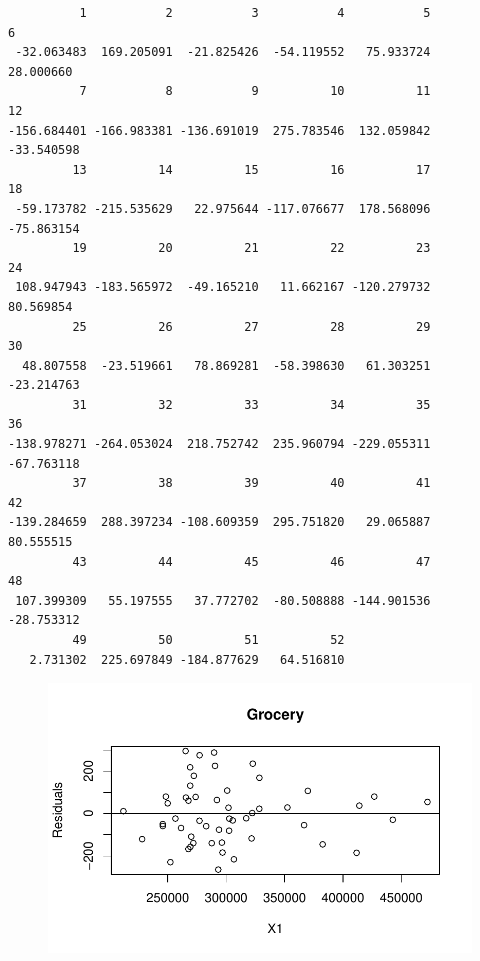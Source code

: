 \documentclass[
  letterpaper,
  DIV=11,
  numbers=noendperiod]{scrartcl}
\newenvironment{Shaded}{\begin{snugshade}}{\end{snugshade}}
\newcommand{\AttributeTok}[1]{\textcolor[rgb]{0.40,0.45,0.13}{#1}}
\newcommand{\CommentTok}[1]{\textcolor[rgb]{0.37,0.37,0.37}{#1}}
\newcommand{\DecValTok}[1]{\textcolor[rgb]{0.68,0.00,0.00}{#1}}
\newcommand{\FunctionTok}[1]{\textcolor[rgb]{0.28,0.35,0.67}{#1}}
\newcommand{\NormalTok}[1]{\textcolor[rgb]{0.00,0.23,0.31}{#1}}
\newcommand{\SpecialCharTok}[1]{\textcolor[rgb]{0.37,0.37,0.37}{#1}}
\newcommand{\StringTok}[1]{\textcolor[rgb]{0.13,0.47,0.30}{#1}}
\begin{document}
\begin{verbatim}
          1           2           3           4           5           6 
 -32.063483  169.205091  -21.825426  -54.119552   75.933724   28.000660 
          7           8           9          10          11          12 
-156.684401 -166.983381 -136.691019  275.783546  132.059842  -33.540598 
         13          14          15          16          17          18 
 -59.173782 -215.535629   22.975644 -117.076677  178.568096  -75.863154 
         19          20          21          22          23          24 
 108.947943 -183.565972  -49.165210   11.662167 -120.279732   80.569854 
         25          26          27          28          29          30 
  48.807558  -23.519661   78.869281  -58.398630   61.303251  -23.214763 
         31          32          33          34          35          36 
-138.978271 -264.053024  218.752742  235.960794 -229.055311  -67.763118 
         37          38          39          40          41          42 
-139.284659  288.397234 -108.609359  295.751820   29.065887   80.555515 
         43          44          45          46          47          48 
 107.399309   55.197555   37.772702  -80.508888 -144.901536  -28.753312 
         49          50          51          52 
   2.731302  225.697849 -184.877629   64.516810 
\end{verbatim}

\begin{Shaded}
\end{Shaded}

\begin{figure}[H]

{\centering \includegraphics{sta9700_herlan_ch6_2023_04_12_files/figure-pdf/unnamed-chunk-17-1.pdf}

}

\end{figure}
\end{document}
